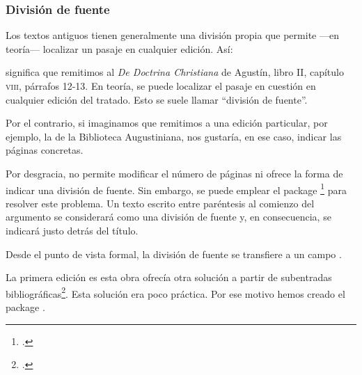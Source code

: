 \subsubsection{División de fuente}\label{divisionsource}

Los textos antiguos tienen generalmente una división propia que
permite ---en teoría--- localizar un pasaje en cualquier edición. Así:

\begin{quotation}
\cite{DoctrineChretienneDivision}
\end{quotation}

significa que remitimos al \emph{De Doctrina Christiana}
de Agustín, libro II, capítulo \textsc{viii}, párrafos 12-13. En
teoría, se puede localizar el pasaje en cuestión en cualquier edición
del tratado. Esto se suele llamar \enquote{división de fuente}.


Por el contrario, si imaginamos que remitimos a una edición particular,
por ejemplo, la de la Biblioteca Augustiniana, nos gustaría, en ese
caso, indicar las páginas concretas.

\begin{quotation}
\cite[(II, \textsc{viii}, 12-13)150-155]{DeDoctChr}
\end{quotation}

Por desgracia,  no permite modificar el número de
páginas ni ofrece la forma de indicar una división de fuente. Sin
embargo, se puede emplear el package
\footcite{biblatex-source-division}
para resolver este problema. Un texto escrito entre paréntesis al
comienzo del argumento  se considerará como una división
de fuente y, en consecuencia, se indicará justo detrás del título.

\begin{latexcode}
\cite[(II, \textsc{viii}, 12-13)150-155]{DeDoctChr}
\end{latexcode}


\begin{plusloins}
  Desde el punto de vista formal, la división de fuente se transfiere
  a un campo .

  La primera edición es esta obra ofrecía otra solución a partir de
  subentradas bibliográficas\footcite[112-113]{Rouquette2012}. Esta
  solución era poco práctica. Por ese motivo hemos creado el package
  .
\end{plusloins}



